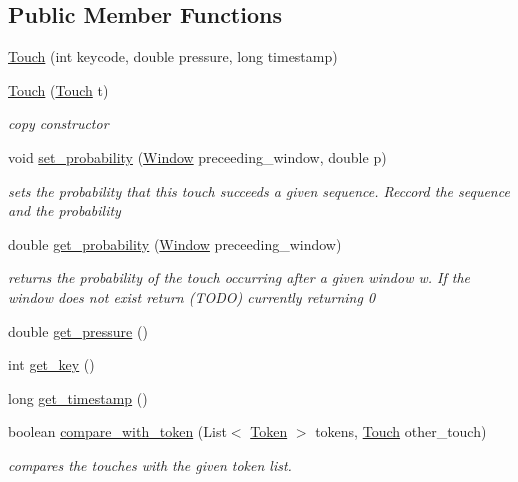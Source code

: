 \subsection*{Public Member Functions}
\begin{DoxyCompactItemize}
\item 
\hyperlink{classcomponents_1_1_touch_abb291d0bd5aa18b2fbec3bf1d0d3f3fa}{Touch} (int keycode, double pressure, long timestamp)
\item 
\hyperlink{classcomponents_1_1_touch_a371ee9fd78523d19ee3b3ab9b57f5aff}{Touch} (\hyperlink{classcomponents_1_1_touch}{Touch} t)
\begin{DoxyCompactList}\small\item\em copy constructor \end{DoxyCompactList}\item 
void \hyperlink{classcomponents_1_1_touch_a407c6a87b0109d73ac0c84c32a38caf4}{set\+\_\+probability} (\hyperlink{classcomponents_1_1_window}{Window} preceeding\+\_\+window, double p)
\begin{DoxyCompactList}\small\item\em sets the probability that this touch succeeds a given sequence. Reccord the sequence and the probability \end{DoxyCompactList}\item 
double \hyperlink{classcomponents_1_1_touch_aa7eaadaf00950e7e7076136be30d00bd}{get\+\_\+probability} (\hyperlink{classcomponents_1_1_window}{Window} preceeding\+\_\+window)
\begin{DoxyCompactList}\small\item\em returns the probability of the touch occurring after a given window w. If the window does not exist return (T\+O\+DO) currently returning 0 \end{DoxyCompactList}\item 
double \hyperlink{classcomponents_1_1_touch_aa47273ddf1ef9ed00285bcee6cfd4eba}{get\+\_\+pressure} ()
\item 
int \hyperlink{classcomponents_1_1_touch_a7c61094e11f0dfeaf37e72a67fd04121}{get\+\_\+key} ()
\item 
long \hyperlink{classcomponents_1_1_touch_aab5b8034bd2970c1d7a2169adfcf53e6}{get\+\_\+timestamp} ()
\item 
boolean \hyperlink{classcomponents_1_1_touch_a7cb910d6f460cc8ba5f101786131e07d}{compare\+\_\+with\+\_\+token} (List$<$ \hyperlink{classcomponents_1_1_token}{Token} $>$ tokens, \hyperlink{classcomponents_1_1_touch}{Touch} other\+\_\+touch)
\begin{DoxyCompactList}\small\item\em compares the touches with the given token list. \end{DoxyCompactList}\item 

\end{DoxyCompactItemize}
